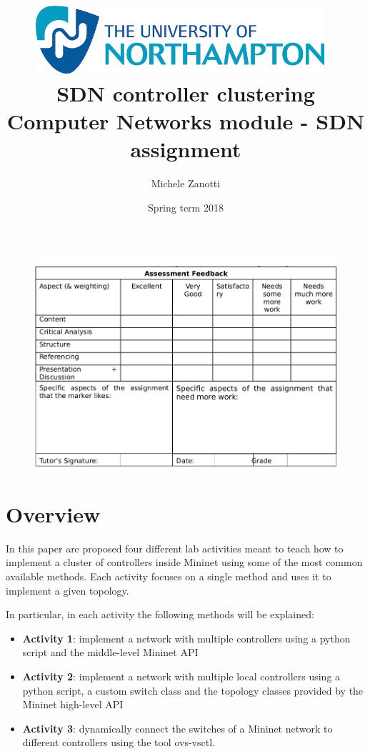 \documentclass[12pt, a4paper]{article}
\title{
  \includegraphics[width=0.8\textwidth]{img/logo.png}~ \\
  SDN controller clustering \\ \large Computer Networks module - SDN assignment
}
\author{Michele Zanotti}
\date{Spring term 2018}
\begin{document}
\maketitle
\begin{figure}[htb]
	\centering
	\includegraphics[width=1\linewidth]{img/valuation-table.png}
\end{figure}

\newpage





\section*{Overview}
In this paper are proposed four different lab activities meant to teach how to implement
a cluster of controllers inside Mininet using some of the most common available methods.
Each activity focuses on a single method and uses it to implement a given topology.

In particular, in each activity the following methods will be explained:
\begin{itemize}
  \item \textbf{Activity 1}: implement a network with multiple controllers using a python
  script and the middle-level Mininet API
  \item \textbf{Activity 2}: implement a network with multiple local controllers using a python
  script, a custom switch class and the topology classes provided by the Mininet high-level API
  \item \textbf{Activity 3}: dynamically connect the switches of a Mininet
  network to different controllers using the tool ovs-vsctl.
\end{itemize}
\end{document}
